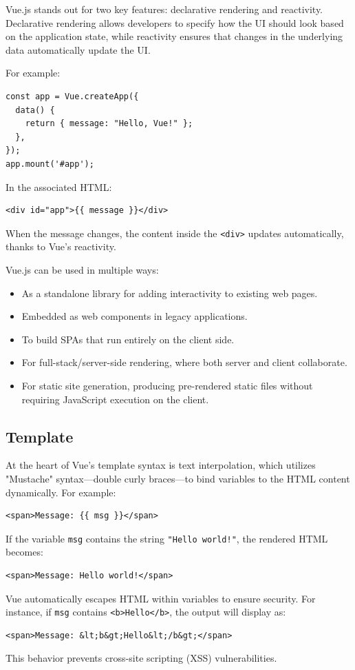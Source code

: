 Vue.js stands out for two key features: declarative rendering and reactivity. Declarative rendering allows developers to specify how the UI should look based on the application state, while reactivity ensures that changes in the underlying data automatically update the UI.

For example:

\begin{verbatim}
const app = Vue.createApp({
  data() {
    return { message: "Hello, Vue!" };
  },
});
app.mount('#app');
\end{verbatim}
In the associated HTML:
\begin{verbatim}
<div id="app">{{ message }}</div>
\end{verbatim}
When the message changes, the content inside the \texttt{<div>} updates automatically, thanks to Vue's reactivity.

Vue.js can be used in multiple ways:
\begin{itemize}
    \item As a standalone library for adding interactivity to existing web pages.
    \item Embedded as web components in legacy applications.
    \item To build SPAs that run entirely on the client side.
    \item For full-stack/server-side rendering, where both server and client collaborate.
    \item For static site generation, producing pre-rendered static files without requiring JavaScript execution on the client.
\end{itemize}

\subsection*{Template}
At the heart of Vue's template syntax is text interpolation, which utilizes "Mustache" syntax—double curly braces—to bind variables to the HTML content dynamically. For example:
\begin{verbatim}
<span>Message: {{ msg }}</span>
\end{verbatim}
If the variable \texttt{msg} contains the string \texttt{"Hello world!"}, the rendered HTML becomes:
\begin{verbatim}
<span>Message: Hello world!</span>
\end{verbatim}
Vue automatically escapes HTML within variables to ensure security. For instance, if \texttt{msg} contains \texttt{<b>Hello</b>}, the output will display as:
\begin{verbatim}
<span>Message: &lt;b&gt;Hello&lt;/b&gt;</span>
\end{verbatim}
This behavior prevents cross-site scripting (XSS) vulnerabilities.

